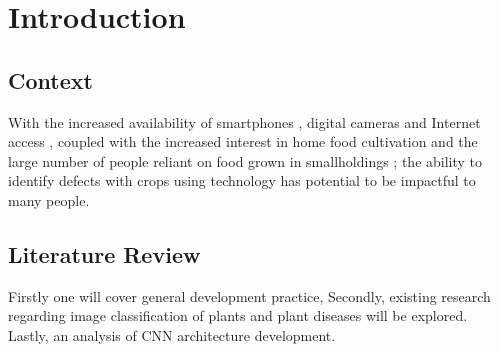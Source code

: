 \chapter{Introduction}
\label{introduction}

\section{Context}
  With the increased availability of smartphones \citep{Statista:2021}, digital cameras \citep{ImarcGroup} and Internet access \citep{Wikipedia} \citep{Globaltt}, coupled with the increased interest in home food cultivation \citep{Google} and the large number of people reliant on food grown in smallholdings \citep{JLIFADSmallHolders}; the ability to identify defects with crops using technology has potential to be impactful to many people.
\section{Literature Review}
  Firstly one will cover general development practice, Secondly, existing research regarding image classification of plants and plant diseases will be explored. Lastly, an analysis of CNN architecture development.
